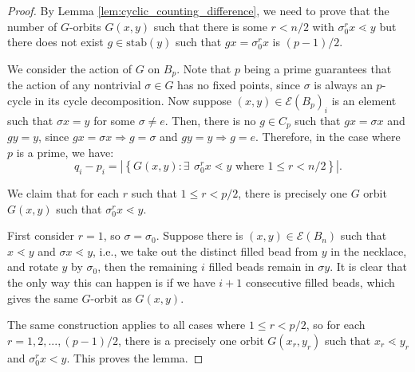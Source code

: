 \documentclass[10 pt]{amsart}
\theoremstyle{plain}
\theoremstyle{definition}
\theoremstyle{remark}
\numberwithin{equation}{section}
\begin{document}
\begin{proof}  By Lemma \ref{lem:cyclic_counting_difference}, we need to prove that the number of $G$-orbits $G(x,y)$ such that there is some $r < n/2$ with $\sigma_0^r x \lessdot y$ but there does not exist $g \in \text{stab}(y)$ such that $gx = \sigma_0^r x$ is $(p-1)/2.$ 

 We consider the action of $G$ on $B_p$. 
 Note that $p$ being a prime guarantees that the action of any nontrivial $\sigma \in G$ has no fixed points, since $\sigma$ is always an $p$-cycle in its cycle decomposition. Now suppose $(x, y) \in  \mathcal E(B_p)_i$  is an element such that $\sigma x =y$ for some $\sigma \neq e$. Then, there is no $g \in C_p$ such that $gx = \sigma x$ and $g y = y$, since $gx = \sigma x \Rightarrow g = \sigma $ and $g y = y \Rightarrow g = e$. Therefore, in the case where $p$ is a prime,  we have: 
 $$q_i - p_i = |\left\{G{(x, y)} : \exists \: \, \sigma_0^r x \lessdot y \text{ where } 1 \le r < n/2 \right\}|.$$


We claim that for each $r$ such that $1 \le r < p/2$, there is precisely one $G$ orbit $G(x, y)$ such that $\sigma_0^r x \lessdot y$. 

First consider $r = 1$, so $\sigma = \sigma_0$. Suppose there is $(x,y) \in  \mathcal E(B_n)$ such that $x \lessdot y$ and $\sigma x \lessdot y$, i.e., we take out the distinct filled bead from $y$ in the necklace, and rotate $y$ by $\sigma_0$, then the remaining $i$ filled beads remain in $\sigma y$. It is clear that the only way this can happen is if we have $i+1$ consecutive filled beads, which gives the same $G$-orbit as $G(x, y)$.

The same construction applies to all cases where $1 \le r < p/2$, so for each $r = 1, 2, ..., (p-1)/2$, there is a precisely one orbit $G(x_r,y_r)$ such that $x_r \lessdot y_r$ and $\sigma_0^r  x < y$. This proves the lemma.
\end{proof}
\end{document}
